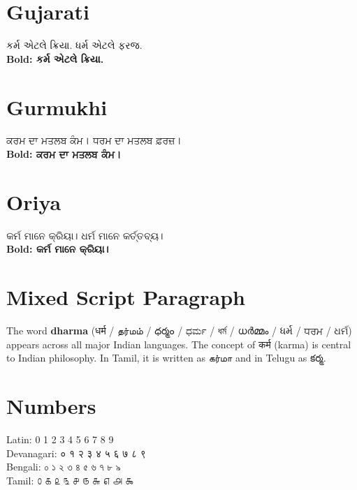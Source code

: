 \documentclass[a4paper,12pt]{article}
\begin{document}
\section{Gujarati}
કર્મ એટલે ક્રિયા. ધર્મ એટલે ફરજ. \\
\textbf{Bold: કર્મ એટલે ક્રિયા.}

\section{Gurmukhi}
ਕਰਮ ਦਾ ਮਤਲਬ ਕੰਮ। ਧਰਮ ਦਾ ਮਤਲਬ ਫ਼ਰਜ਼। \\
\textbf{Bold: ਕਰਮ ਦਾ ਮਤਲਬ ਕੰਮ।}

\section{Oriya}
କର୍ମ ମାନେ କ୍ରିୟା। ଧର୍ମ ମାନେ କର୍ତ୍ତବ୍ୟ। \\
\textbf{Bold: କର୍ମ ମାନେ କ୍ରିୟା।}

\section{Mixed Script Paragraph}
The word \textbf{dharma} (धर्म / தர்மம் / ధర్మం / ಧರ್ಮ / ধর্ম / ധർമ്മം / ધર્મ / ਧਰਮ / ଧର୍ମ)
appears across all major Indian languages. The concept of कर्म (karma) is central to
Indian philosophy. In Tamil, it is written as கர்மா and in Telugu as కర్మ.

\section{Numbers}
Latin: 0 1 2 3 4 5 6 7 8 9 \\
Devanagari: ० १ २ ३ ४ ५ ६ ७ ८ ९ \\
Bengali: ০ ১ ২ ৩ ৪ ৫ ৬ ৭ ৮ ৯ \\
Tamil: ௦ ௧ ௨ ௩ ௪ ௫ ௬ ௭ ௮ ௯
\end{document}
